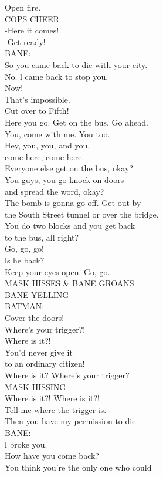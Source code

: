 \documentclass{article}
\begin{document}
\begin{multicols}{3}
Open fire.\\
COPS CHEER\\
-Here it comes!\\
-Get ready!\\
BANE:\\
So you came back to die with your city.\\
No. l came back to stop you.\\
Now!\\
That's impossible.\\
Cut over to Fifth!\\
Here you go. Get on the bus. Go ahead.\\
You, come with me. You too.\\
Hey, you, you, and you,\\
come here, come here.\\
Everyone else get on the bus, okay?\\
You guys, you go knock on doors\\
and spread the word, okay?\\
The bomb is gonna go off. Get out by\\
the South Street tunnel or over the bridge.\\
You do two blocks and you get back\\
to the bus, all right?\\
Go, go, go!\\
ls he back?\\
Keep your eyes open. Go, go.\\
MASK HISSES & BANE GROANS\\
BANE YELLING\\
BATMAN:\\
Cover the doors!\\
Where's your trigger?!\\
Where is it?!\\
You'd never give it\\
to an ordinary citizen!\\
Where is it? Where's your trigger?\\
MASK HISSING\\
Where is it?! Where is it?!\\
Tell me where the trigger is.\\
Then you have my permission to die.\\
BANE:\\
l broke you.\\
How have you come back?\\
You think you're the only one who could\\

\end{multicols}
\end{document}
